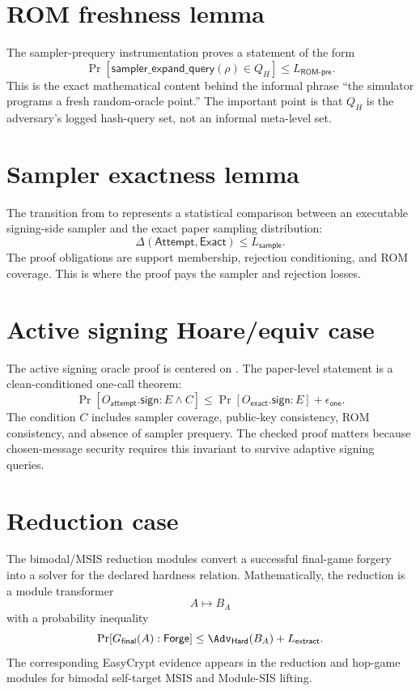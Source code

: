 \section{ROM freshness lemma}

The sampler-prequery instrumentation proves a statement of the form
\[
  \Pr[\mathsf{sampler\_expand\_query}(\rho)\in Q_H]
  \le
  L_{\mathsf{ROM\mbox{-}pre}}.
\]
This is the exact mathematical content behind the informal phrase ``the simulator
programs a fresh random-oracle point.''  The important point is that \(Q_H\) is
the adversary's logged hash-query set, not an informal meta-level set.

\section{Sampler exactness lemma}

The transition from
 to
 represents a statistical
comparison between an executable signing-side sampler and the exact paper
sampling distribution:
\[
  \Delta(\mathsf{Attempt},\mathsf{Exact})\le L_{\mathsf{sample}}.
\]
The proof obligations are support membership, rejection conditioning, and ROM
coverage.  This is where the proof pays the sampler and rejection losses.

\section{Active signing Hoare/equiv case}

The active signing oracle proof is centered on .  The paper-level
statement is a clean-conditioned one-call theorem:
\[
  \Pr[O_{\mathsf{attempt}}.\mathsf{sign}:E\wedge C]
  \le
  \Pr[O_{\mathsf{exact}}.\mathsf{sign}:E]+\epsilon_{\mathsf{one}}.
\]
The condition \(C\) includes sampler coverage, public-key consistency, ROM
consistency, and absence of sampler prequery.  The checked proof matters because
chosen-message security requires this invariant to survive adaptive signing
queries.

\section{Reduction case}

The bimodal/MSIS reduction modules convert a successful final-game forgery into
a solver for the declared hardness relation.  Mathematically, the reduction is a
module transformer
\[
  A \mapsto B_A
\]
with a probability inequality
\[
  \Pr[G_{\mathsf{final}}(A):\mathsf{Forge}]
  \le
  \Adv_{\mathsf{Hard}}(B_A)+L_{\mathsf{extract}}.
\]
The corresponding EasyCrypt evidence appears in the reduction and hop-game
modules for bimodal self-target MSIS and Module-SIS lifting.

